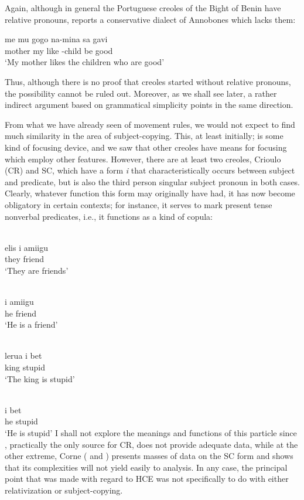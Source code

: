 Again, although in general the Portuguese creoles of the Bight of Benin have relative pronouns, \citet[97]{Valkoff1966} reports a conserva\-tive dialect of Annobones which lacks them:

\ea\label{ex:2:43}
\gll  me mu gogo na-mina sa gavi \\
mother my like {\PL}-child be good\\
\glt `My mother likes the children who are good'
\z

Thus, although there is no proof that creoles started without relative pronouns, the possibility cannot be ruled out. Moreover, as we shall see later, a rather indirect argument based on grammatical sim\-plicity points in the same direction.

From what we have already seen of movement rules, we would not expect to find much similarity in the area of subject-copying. This, at least initially; is some kind of focusing device, and we saw that other creoles have means for focusing which employ other features. However, there are at least two creoles, Crioulo (CR) and SC, which have a form \textit{i} that characteristically occurs between subject and predicate, but is also the third person singular subject pronoun in both cases. Clearly, what\-ever function this form may originally have had, it has now become obligatory in certain contexts; for instance, it serves to mark present tense nonverbal predicates, i.e., it functions as a kind of copula:

\ea\label{ex:2:44}
\langinfo{\langCR}{}{}\\
 \gll elis i amiigu\\
they {\PM} friend\\
\glt `They are friends'
\z

\ea\label{ex:2:45}
\langinfo{\langCR}{}{}\\
 \gll i amiigu\\
he friend\\
\glt `He is a friend'
\z

\ea\label{ex:2:46}
\langinfo{\langSC}{}{}\\
 \gll lerua i bet\\
king {\PM} stupid\\
\glt `The king is stupid'
\z

 

\ea\label{ex:2:47}
\langinfo{\langSC}{}{}\\
\gll i bet\\
he stupid\\
\glt `He is stupid'
\z
I shall not explore the meanings and functions of this particle since \citet{Wilson1962}, practically the only source for CR, does not provide adequate data, while at the other extreme, Corne (\citeyear{Corne1974-75} and \citeyear{Corne1977}) presents masses of data on the SC form and shows that its complexities will not yield easily to analysis. In any case, the principal point that was made with regard to HCE was not specifically to do with either relativization or subject-copying.

